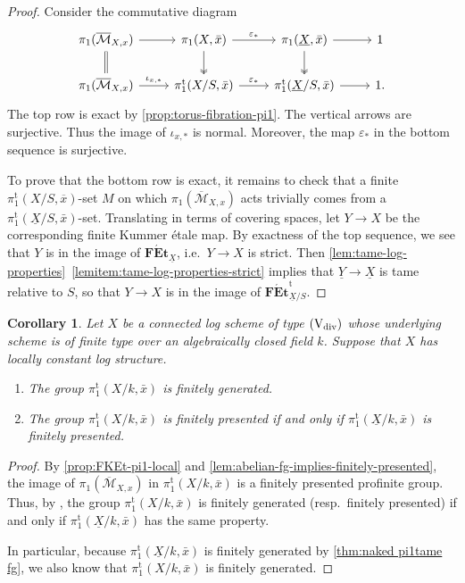 \documentclass[a4paper,twoside,11pt,reqno]{amsart}
\newcommand{\cM}{{\mathcal M}}
\newcommand{\cat}[1]{\mathbf{#1}}
\newcommand{\FEt}{\cat{F\acute{E}t}}
\newcommand{\ov}[1]{\overline{#1}}
\newcommand{\ep}{\varepsilon}
\newcommand{\typeVd}{(\mathrm{V}_{\rm div})}
\newcommand{\pitame}{\pi_1^{\mathrm{t}}}
\newcommand{\FEtt}{{\cat{F\acute{E}t}}^{\!\mathrm{t}}}
\newtheorem{cor}[thm]{Corollary}
\theoremstyle{definition}
\numberwithin{equation}{subsection}
\begin{document}
\begin{proof}
Consider the commutative diagram
\[
    \begin{tikzcd}
        \pi_1(\ov \cM_{X,x}) \ar[d,equal] \ar[r] & \pi_1(X,\bar x) \ar[r,"\ep_\ast"]\ar[d,two heads]  & \pi_1(\underline{X},\bar x) \ar[r]\ar[d,two heads] & 1 \\
        \pi_1(\ov \cM_{X,x}) \ar[r,"\iota_{x,\ast}"] & \pitame(X/S,\bar x) \ar[r,"\ep_\ast"] & \pitame(\underline{X}/S,\bar x) \ar[r] & 1.
    \end{tikzcd}
\]
The top row is exact by \cref{prop:torus-fibration-pi1}. The vertical arrows are surjective. Thus the image of $\iota_{x,\ast}$ is normal. Moreover, the map $\varepsilon_*$ in the bottom sequence is surjective. 

To prove that the bottom row is exact, it remains to check that a finite $\pitame(X/S,\ov{x})$-set $M$ on which $\pi_1(\ov \cM_{X,x})$ acts trivially comes from a $\pitame(\underline{X}/S,\bar x)$-set. Translating in terms of covering spaces, let $Y\to X$ be the corresponding finite Kummer \'etale map. By exactness of the top sequence, we see that $Y$ is in the image of $\FEt_{\underline{X}}$, i.e.\ $Y\to X$ is strict. Then \cref{lem:tame-log-properties}~\ref{lemitem:tame-log-properties-strict} implies that $\underline{Y}\to\underline{X}$ is tame relative to $S$, so that $Y\to X$ is in the image of $\FEtt_{\underline{X}/S}$.
\end{proof}

\begin{cor}
\label{cor:pi1tame locally constant log is fg}
    Let $X$ be a connected log scheme of type $\typeVd$ whose underlying scheme is of finite type over an algebraically closed field $k$. Suppose that $X$ has locally constant log structure.
    \begin{enumerate}
        \item 
        The group $\pitame(X/k,\bar x)$ is finitely generated.
        \item 
        The group $\pitame(X/k,\bar x)$ is finitely presented if and only if $\pitame(\underline{X}/k,\bar x)$ is finitely presented.
    \end{enumerate}
\end{cor}

\begin{proof}
    By \cref{prop:FKEt-pi1-local} and 
    \cref{lem:abelian-fg-implies-finitely-presented},
    the image of 
    $\pi_1(\ov \cM_{X,x})$ in $\pitame(X/k,\bar x)$ is a finitely presented profinite group.  
    Thus, by 
    \cite[Proof of Claim~2.7]{EsnaultShustermanSrinivas2022:FinitePresentationTame}, the group 
    $\pitame(X/k,\bar x)$ is finitely generated (resp.\ finitely presented) if and only if $\pitame(\underline{X}/k,\bar x)$ has the same property. 

    In particular, because $\pitame(\underline{X}/k,\bar x)$ is finitely generated by \cref{thm:naked pi1tame fg}, we also know that $\pitame(X/k,\bar x)$ is finitely generated.    
\end{proof}
\end{document}

